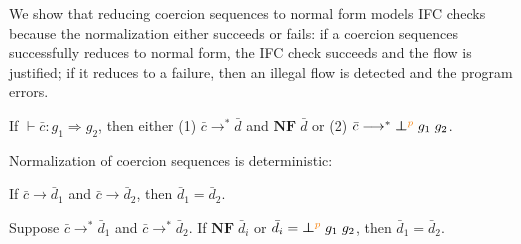 We show that reducing coercion sequences to normal form models IFC
checks because the normalization either succeeds or fails: if a
coercion sequences successfully reduces to normal form, the IFC check
succeeds and the flow is justified; if it reduces to a failure, then
an illegal flow is detected and the program errors.

\begin{lemma}
If $\vdash \bar{c} : g_1 \Rightarrow g_2$, then either
(1) $\bar{c} \longrightarrow^{*} \bar{d}$ and $\mathbf{NF}\;\bar{d}$ or
(2) $\bar{c} \longrightarrow^{*} \err{g_1}{g_2}{p}$.
\end{lemma}

\noindent Normalization of coercion sequences is deterministic:

\begin{lemma}
If $\bar{c} \longrightarrow \bar{d}_1$ and $\bar{c} \longrightarrow \bar{d}_2$,
then $\bar{d}_1 = \bar{d}_2$.
\end{lemma}

\begin{lemma}
Suppose $\bar{c} \longrightarrow^{*} \bar{d}_1$
and $\bar{c} \longrightarrow^{*} \bar{d}_2$.
If $\mathbf{NF}\;\bar{d}_i$ or $\bar{d}_i = \err{g_1}{g_2}{p}$,
then $\bar{d}_1 = \bar{d}_2$.
\end{lemma}

